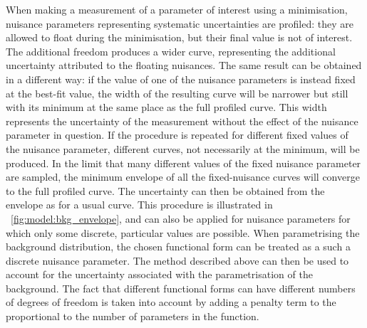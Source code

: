 When making a measurement of a parameter of interest using a \NLL minimisation, nuisance parameters representing systematic uncertainties are profiled: they are allowed to float during the minimisation, but their final value is not of interest. The additional freedom produces a wider \NLL curve, representing the additional uncertainty attributed to the floating nuisances. 
The same result can be obtained in a different way: if the value of one of the nuisance parameters is instead fixed at the best-fit value, the width of the resulting \NLL curve will be narrower but still with its minimum at the same place as the full profiled \NLL curve. This width represents the uncertainty of the measurement without the effect of the nuisance parameter in question. If the procedure is repeated for different fixed values of the nuisance parameter, different \NLL curves, not necessarily at the minimum, will be produced. In the limit that many different values of the fixed nuisance parameter are sampled, the minimum envelope of all the fixed-nuisance \NLL curves will converge to the full profiled \NLL curve. The uncertainty can then be obtained from the envelope as for a usual \NLL curve. This procedure is illustrated in \Fig~\ref{fig:model:bkg_envelope}, and can also be applied for nuisance parameters for which only some discrete, particular values are possible. When parametrising the background distribution, the chosen functional form can be treated as a such a discrete nuisance parameter. The method described above can then be used to account for the uncertainty associated with the parametrisation of the background. The fact that different functional forms can have different numbers of degrees of freedom is taken into account by adding a penalty term to the \NLL proportional to the number of parameters in the function. 

